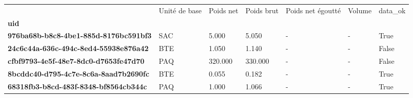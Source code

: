 \begin{tabularx}{\linewidth}{lXXXXXX}
\toprule
{} & Unité de base &  Poids net &  Poids brut &  Poids net égoutté &  Volume &  data\_ok \\
\textbf{uid                                 } &               &            &             &                    &         &          \\
\midrule
\textbf{976ba68b-b8c8-4be1-885d-8176bc591bf3} &           SAC &      5.000 &       5.050 &                  - &       - &     True \\
\textbf{24c6c44a-636c-494c-8ed4-55938e876a42} &           BTE &      1.050 &       1.140 &                  - &       - &    False \\
\textbf{cfbf9793-4e5f-48e7-8dc0-d7653fe47d70} &           PAQ &    320.000 &     330.000 &                  - &       - &    False \\
\textbf{8bcddc40-d795-4c7e-8c6a-8aad7b2690fc} &           BTE &      0.055 &       0.182 &                  - &       - &     True \\
\textbf{68318fb3-b8cd-483f-8348-bf8564cb344c} &           PAQ &      1.000 &       1.066 &                  - &       - &     True \\
\bottomrule
\end{tabularx}
